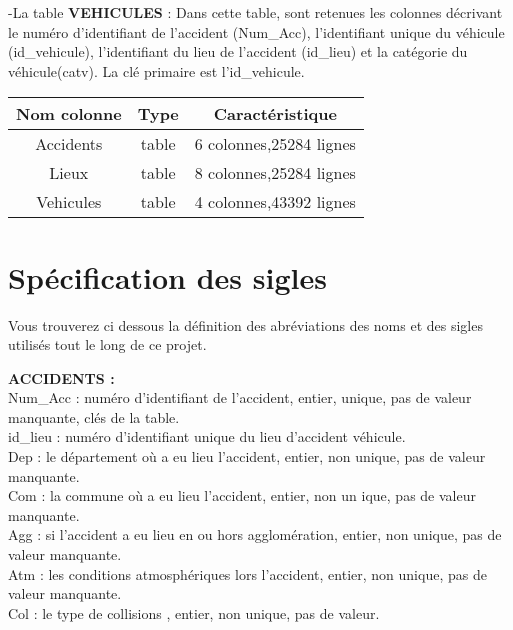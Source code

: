 \documentclass[mstat,12pt]{unswthesis}
\begin{document}
\medskip

-La table \textbf{VEHICULES} : Dans cette table, sont retenues les
colonnes décrivant le numéro d'identifiant de l'accident (Num\_Acc),
l'identifiant unique du véhicule (id\_vehicule), l'identifiant du lieu
de l'accident (id\_lieu) et la catégorie du véhicule(catv). La clé
primaire est l'id\_vehicule.

\begin{longtable}[]{@{}ccc@{}}
\toprule()
Nom colonne & Type & Caractéristique \\
\midrule()
\endhead
Accidents & table & 6 colonnes,25284 lignes \\
Lieux & table & 8 colonnes,25284 lignes \\
Vehicules & table & 4 colonnes,43392 lignes \\
\bottomrule()
\end{longtable}

\hypertarget{spuxe9cification-des-sigles}{%
\section{Spécification des sigles}\label{spuxe9cification-des-sigles}}

\medskip

Vous trouverez ci dessous la définition des abréviations des noms et des
sigles utilisés tout le long de ce projet.

\medskip \textbf{ACCIDENTS : }\\
Num\_Acc : numéro d'identifiant de l'accident, entier, unique, pas de
valeur manquante, clés de la table.\\
id\_lieu : numéro d'identifiant unique du lieu d'accident véhicule.\\
Dep : le département où a eu lieu l'accident, entier, non unique, pas de
valeur manquante.\\
Com : la commune où a eu lieu l'accident, entier, non un ique, pas de
valeur manquante.\\
Agg : si l'accident a eu lieu en ou hors agglomération, entier, non
unique, pas de valeur manquante.\\
Atm : les conditions atmosphériques lors l'accident, entier, non unique,
pas de valeur manquante.\\
Col : le type de collisions , entier, non unique, pas de valeur.\\
\medskip
\end{document}
